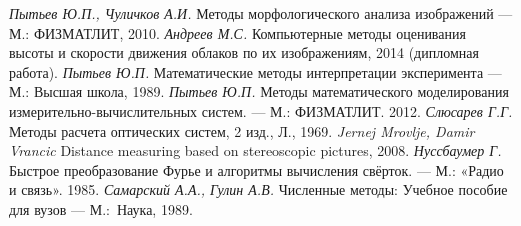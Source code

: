 \begin{thebibliography}{99}
 \emph{Пытьев Ю.П., Чуличков А.И.} Методы морфологического анализа изображений --- М.: ФИЗМАТЛИТ, 2010.
 \emph{Андреев М.С.} Компьютерные методы оценивания высоты и скорости движения облаков по их изображениям, 2014 (дипломная работа).
 \emph{Пытьев Ю.П.} Математические методы интерпретации эксперимента --- М.: Высшая школа, 1989.
 \emph{Пытьев Ю.П.} Методы математического моделирования измерительно-вычислительных систем. --- М.: ФИЗМАТЛИТ. 2012.
 \emph{Слюсарев Г.Г.} Методы расчета оптических систем, 2 изд., Л., 1969.
 \emph{Jernej Mrovlje, Damir Vrancic} Distance measuring based on stereoscopic pictures, 2008.
 \emph{Нуссбаумер Г.} Быстрое преобразование Фурье и алгоритмы вычисления свёрток. --- М.: «Радио и связь». 1985.
 \emph{Самарский А.А., Гулин А.В.} Численные методы: Учебное пособие для
вузов --- М.:~Наука, 1989.



\end{thebibliography}

